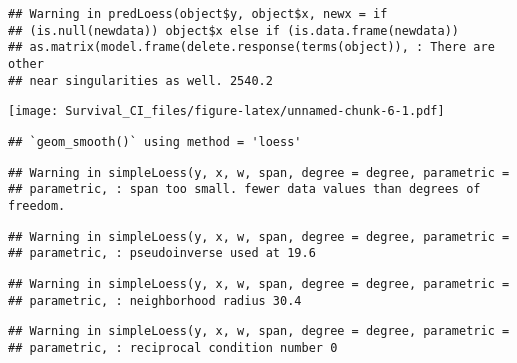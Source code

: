 \documentclass[]{article}
\newenvironment{Shaded}{\begin{snugshade}}{\end{snugshade}}
\newcommand{\KeywordTok}[1]{\textcolor[rgb]{0.13,0.29,0.53}{\textbf{{#1}}}}
\newcommand{\DataTypeTok}[1]{\textcolor[rgb]{0.13,0.29,0.53}{{#1}}}
\newcommand{\StringTok}[1]{\textcolor[rgb]{0.31,0.60,0.02}{{#1}}}
\newcommand{\NormalTok}[1]{{#1}}
\begin{document}
\begin{verbatim}
## Warning in predLoess(object$y, object$x, newx = if
## (is.null(newdata)) object$x else if (is.data.frame(newdata))
## as.matrix(model.frame(delete.response(terms(object)), : There are other
## near singularities as well. 2540.2
\end{verbatim}

\texttt{[image: Survival\_CI\_files/figure-latex/unnamed-chunk-6-1.pdf]}

\begin{Shaded}
\end{Shaded}

\begin{verbatim}
## `geom_smooth()` using method = 'loess'
\end{verbatim}

\begin{verbatim}
## Warning in simpleLoess(y, x, w, span, degree = degree, parametric =
## parametric, : span too small. fewer data values than degrees of freedom.
\end{verbatim}

\begin{verbatim}
## Warning in simpleLoess(y, x, w, span, degree = degree, parametric =
## parametric, : pseudoinverse used at 19.6
\end{verbatim}

\begin{verbatim}
## Warning in simpleLoess(y, x, w, span, degree = degree, parametric =
## parametric, : neighborhood radius 30.4
\end{verbatim}

\begin{verbatim}
## Warning in simpleLoess(y, x, w, span, degree = degree, parametric =
## parametric, : reciprocal condition number 0
\end{verbatim}
\end{document}
